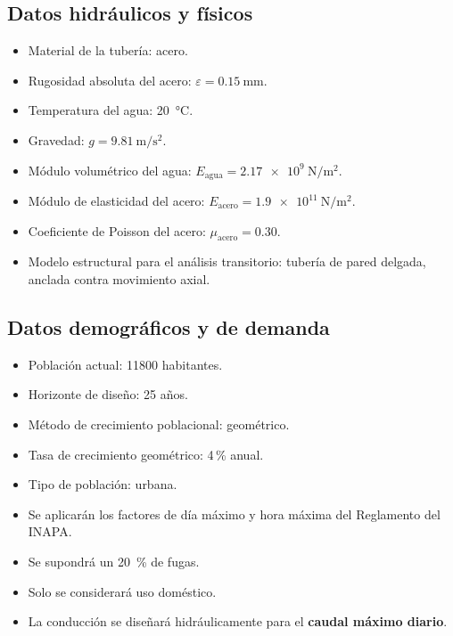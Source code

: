 \documentclass[11pt]{article}
\begin{document}
\subsection{Datos hidráulicos y físicos}
\begin{itemize}
\item Material de la tubería: acero.
\item Rugosidad absoluta del acero: $\varepsilon = \SI{0.15}{\milli\meter}$.
\item Temperatura del agua: \SI{20}{\celsius}.
\item Gravedad: $g = \SI{9.81}{\meter\per\second\squared}$.
\item Módulo volumétrico del agua: $E_{\text{agua}} = \SI{2.17e9}{\newton\per\meter\squared}$.
\item Módulo de elasticidad del acero: $E_{\text{acero}} = \SI{1.9e11}{\newton\per\meter\squared}$.
\item Coeficiente de Poisson del acero: $\mu_{\text{acero}} = 0.30$.
\item Modelo estructural para el análisis transitorio: tubería de pared delgada, anclada contra movimiento axial.
\end{itemize}

\subsection{Datos demográficos y de demanda}
\begin{itemize}
\item Población actual: \num{11800} habitantes.
\item Horizonte de diseño: \num{25} años.
\item Método de crecimiento poblacional: geométrico.
\item Tasa de crecimiento geométrico: \num{4}\,\% anual.
\item Tipo de población: urbana.
\item Se aplicarán los factores de día máximo y hora máxima del Reglamento del INAPA.
\item Se supondrá un \SI{20}{\percent} de fugas.
\item Solo se considerará uso doméstico.
\item La conducción se diseñará hidráulicamente para el \textbf{caudal máximo diario}.
\end{itemize}
\end{document}
